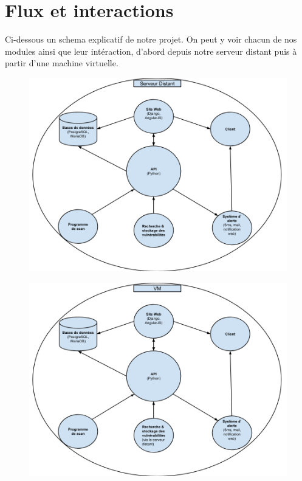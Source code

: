 \section{Flux et interactions}
Ci-dessous un schema explicatif de notre projet. On peut y voir chacun de nos modules ainsi que leur intéraction, d'abord depuis notre serveur distant puis à partir d'une machine virtuelle. 
\begin{figure}[!h]
  \includegraphics[width=18cm]{serveur-distant.png}
\end{figure}

\begin{figure}
  \includegraphics[width=18cm]{vm.png}
\end{figure}